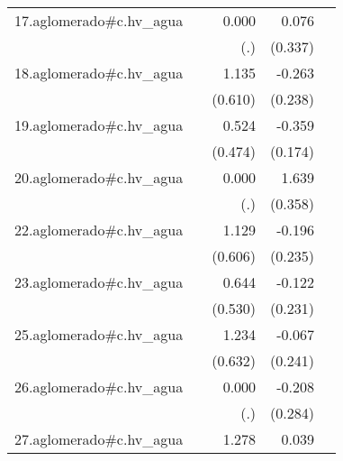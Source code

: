 {\begin{longtable}{l*{4}{D{.}{.}{-1}}}
\addlinespace
17.aglomerado#c.hv\_agua&                     &       0.000         &       0.076         &                     \\
            &                     &         (.)         &     (0.337)         &                     \\
\addlinespace
18.aglomerado#c.hv\_agua&                     &       1.135         &      -0.263         &                     \\
            &                     &     (0.610)         &     (0.238)         &                     \\
\addlinespace
19.aglomerado#c.hv\_agua&                     &       0.524         &      -0.359\sym{*}  &                     \\
            &                     &     (0.474)         &     (0.174)         &                     \\
\addlinespace
20.aglomerado#c.hv\_agua&                     &       0.000         &       1.639\sym{***}&                     \\
            &                     &         (.)         &     (0.358)         &                     \\
\addlinespace
22.aglomerado#c.hv\_agua&                     &       1.129         &      -0.196         &                     \\
            &                     &     (0.606)         &     (0.235)         &                     \\
\addlinespace
23.aglomerado#c.hv\_agua&                     &       0.644         &      -0.122         &                     \\
            &                     &     (0.530)         &     (0.231)         &                     \\
\addlinespace
25.aglomerado#c.hv\_agua&                     &       1.234         &      -0.067         &                     \\
            &                     &     (0.632)         &     (0.241)         &                     \\
\addlinespace
26.aglomerado#c.hv\_agua&                     &       0.000         &      -0.208         &                     \\
            &                     &         (.)         &     (0.284)         &                     \\
\addlinespace
27.aglomerado#c.hv\_agua&                     &       1.278\sym{*}  &       0.039         &                     \\

\end{longtable}}
